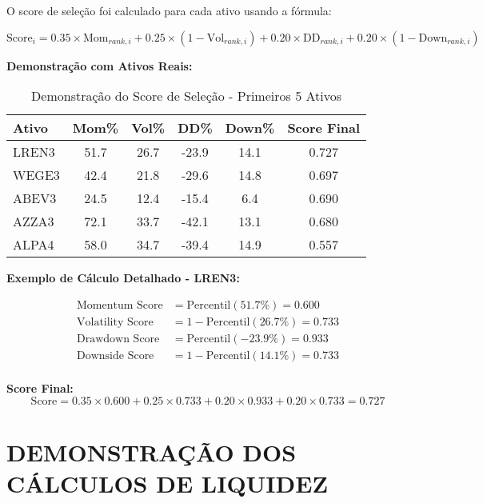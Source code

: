 O score de seleção foi calculado para cada ativo usando a fórmula:

\begin{equation}
\text{Score}_{i} = 0.35 \times \text{Mom}_{rank,i} + 0.25 \times (1-\text{Vol}_{rank,i}) + 0.20 \times \text{DD}_{rank,i} + 0.20 \times (1-\text{Down}_{rank,i})
\end{equation}

\textbf{Demonstração com Ativos Reais:}

\begin{table}[H]
\centering
\caption{Demonstração do Score de Seleção - Primeiros 5 Ativos}
\begin{tabular}{|l|c|c|c|c|c|}
\hline
\textbf{Ativo} & \textbf{Mom\%} & \textbf{Vol\%} & \textbf{DD\%} & \textbf{Down\%} & \textbf{Score Final} \\
\hline
LREN3 & 51.7 & 26.7 & -23.9 & 14.1 & 0.727 \\
WEGE3 & 42.4 & 21.8 & -29.6 & 14.8 & 0.697 \\
ABEV3 & 24.5 & 12.4 & -15.4 & 6.4 & 0.690 \\
AZZA3 & 72.1 & 33.7 & -42.1 & 13.1 & 0.680 \\
ALPA4 & 58.0 & 34.7 & -39.4 & 14.9 & 0.557 \\
\hline
\end{tabular}
\end{table}

\textbf{Exemplo de Cálculo Detalhado - LREN3:}

\begin{align}
\text{Momentum Score} &= \text{Percentil}(51.7\%) = 0.600 \\
\text{Volatility Score} &= 1 - \text{Percentil}(26.7\%) = 0.733 \\
\text{Drawdown Score} &= \text{Percentil}(-23.9\%) = 0.933 \\
\text{Downside Score} &= 1 - \text{Percentil}(14.1\%) = 0.733 \\
\end{align}

\textbf{Score Final:}
\begin{equation}
\text{Score} = 0.35 \times 0.600 + 0.25 \times 0.733 + 0.20 \times 0.933 + 0.20 \times 0.733 = 0.727
\end{equation}

\section{DEMONSTRAÇÃO DOS CÁLCULOS DE LIQUIDEZ}

